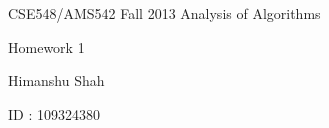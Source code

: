 \documentclass[letterpaper,portrait,12pt]{article}
\begin{document}
\setlength{\oddsidemargin}{0.6250in-1in}

\begin{center}

\end{center}


\begin{center}

\end{center}


\begin{center}

\end{center}


\begin{center}

\end{center}


\begin{center}
{\huge CSE548/AMS542 Fall 2013 Analysis of Algorithms}
\end{center}


\begin{center}

\end{center}


\begin{center}
{\huge Homework 1}
\end{center}


\begin{center}
{\huge Himanshu Shah}
\end{center}


\begin{center}
{\huge ID : 109324380}
\end{center}


\begin{center}

\end{center}


\begin{center}

\end{center}


\begin{center}

\end{center}


\begin{center}

\end{center}


\begin{center}

\end{center}
\end{document}
